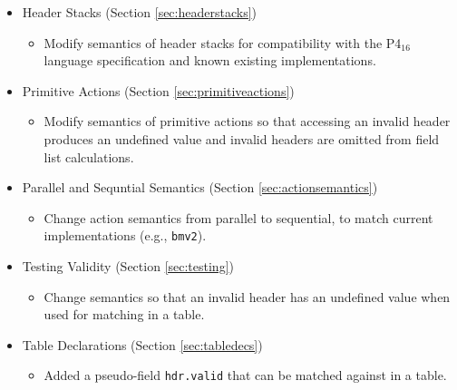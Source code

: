 \documentclass[12pt]{article}
\begin{document}

\begin{itemize}
\item Header Stacks (Section \ref{sec:headerstacks})
\begin{itemize}
\item Modify semantics of header stacks for compatibility with the P4$_16$ language specification and known existing implementations.
\end{itemize}
\end{itemize}
    

\begin{itemize}
\item Primitive Actions (Section \ref{sec:primitiveactions})
\begin{itemize}
\item Modify semantics of primitive actions so that accessing an invalid header produces an undefined value and invalid headers are omitted from field list calculations.
\end{itemize}
\item Parallel and Sequntial Semantics (Section \ref{sec:actionsemantics})
\begin{itemize}
\item Change action semantics from parallel to sequential, to match current implementations (e.g., \texttt{bmv2}).
\end{itemize}
\item Testing Validity (Section \ref{sec:testing})
\begin{itemize}
\item Change semantics so that an invalid header has an undefined value when used for matching in a table.
\end{itemize}
\item Table Declarations (Section \ref{sec:tabledecs})
\begin{itemize}
\item Added a pseudo-field \texttt{hdr.valid} that can be matched against in a table.
\end{itemize}
\end{itemize}

\end{document}
